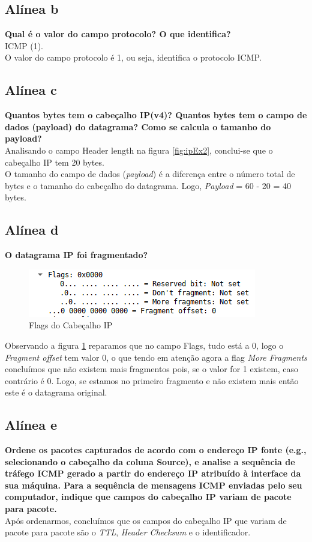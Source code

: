 \documentclass[a4paper]{report}
\begin{document}
\subsection{Alínea b}
\textbf{Qual é o valor do campo protocolo? O que identifica?}\\
ICMP (1).\\
O valor do campo protocolo é 1, ou seja, identifica o protocolo ICMP.

\subsection{Alínea c}
\textbf{Quantos bytes tem o cabeçalho IP(v4)? Quantos bytes tem o campo de dados
(payload) do datagrama? Como se calcula o tamanho 
do payload?}\\
Analisando o campo Header length na figura \ref{fig:ipEx2}, conclui-se que o
cabeçalho IP tem 20 bytes.\\
O tamanho do campo de dados (\textit{payload}) é a diferença entre o número 
total de bytes e o tamanho do cabeçalho do datagrama. Logo, \textit{Payload} =
60 - 20 = 40 bytes.

\subsection{Alínea d}
\textbf{O datagrama IP foi fragmentado? }

\begin{figure}[H]
    \centering 
    \includegraphics[width=\textwidth]{images/ipEx2Flags.png}
    \caption{Flags do Cabeçalho IP}
    \label{fig:ipEx2Flags}
\end{figure}
Observando a figura \ref{fig:ipEx2Flags} reparamos que no campo Flags, tudo está
a 0, logo o \textit{Fragment offset} tem valor 0, o que tendo em atenção agora a
flag \textit{More Fragments} concluímos que não existem mais fragmentos pois, se
o valor for 1 existem, caso contrário é 0. Logo, se estamos no primeiro
fragmento e não existem mais então este é o datagrama original.

\subsection{Alínea e}
\textbf{Ordene os pacotes capturados de acordo com o endereço IP fonte (e.g.,
selecionando o cabeçalho da coluna Source), e analise a sequência de tráfego
ICMP gerado a partir  do endereço IP atribuído à interface da sua máquina. Para
a sequência de mensagens ICMP enviadas pelo seu computador, indique que campos
do cabeçalho IP variam de pacote para pacote.}\\
Após ordenarmos, concluímos que os campos do cabeçalho IP que variam de pacote
para pacote são o \textit{TTL}, \textit{Header Checksum} e o identificador.
\end{document}
